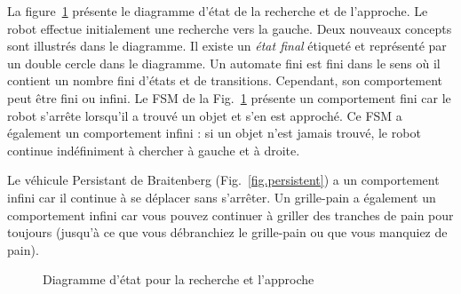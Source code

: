 La figure~\ref{fig.search-approach} présente le diagramme d'état de la recherche et de l'approche. Le robot effectue initialement une recherche vers la gauche. Deux nouveaux concepts sont illustrés dans le diagramme. Il existe un \emph{état final} étiqueté  et représenté par un double cercle dans le diagramme. Un automate fini est fini dans le sens où il contient un nombre fini d'états et de transitions. Cependant, son comportement peut être fini ou infini. Le FSM de la Fig.~\ref{fig.search-approach} présente un comportement fini car le robot s'arrête lorsqu'il a trouvé un objet et s'en est approché. Ce FSM a également un comportement infini : si un objet n'est jamais trouvé, le robot continue indéfiniment à chercher à gauche et à droite.

Le véhicule Persistant de Braitenberg (Fig.~\ref{fig.persistent}) a un comportement infini car il continue à se déplacer sans s'arrêter. Un grille-pain a également un comportement infini car vous pouvez continuer à griller des tranches de pain pour toujours (jusqu'à ce que vous débranchiez le grille-pain ou que vous manquiez de pain).


\begin{figure}
\begin{center}
\caption{Diagramme d'état pour la recherche et l'approche}\label{fig.search-approach}
\end{center}
\end{figure}

